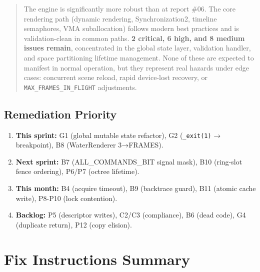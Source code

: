 \documentclass[a4paper,12pt]{article}
\newcommand{\severitybox}[2]{%
  \colorbox{#1}{\makebox[2.5cm][c]{\textcolor{white}{\textbf{#2}}}}%
}
\begin{document}
\medskip
\noindent\severitybox{highcolor}{ADEQUATE}

\begin{quote}
  The engine is significantly more robust than at report \#06. The core
  rendering path (dynamic rendering, Synchronization2, timeline semaphores,
  VMA suballocation) follows modern best practices and is validation-clean
  in common paths. \textbf{2 critical, 6 high, and 8 medium issues remain},
  concentrated in the global state layer, validation handler, and space
  partitioning lifetime management. None of these are expected to manifest
  in normal operation, but they represent real hazards under edge cases:
  concurrent scene reload, rapid device-lost recovery, or
  \texttt{MAX\_FRAMES\_IN\_FLIGHT} adjustments.
\end{quote}

\subsection*{Remediation Priority}

\begin{enumerate}[noitemsep]
  \item[\textbf{P0}] \textbf{This sprint:} G1 (global mutable state refactor),
        G2 (\texttt{\_exit(1)} → breakpoint), B8 (WaterRenderer 3→FRAMES).
  \item[\textbf{P1}] \textbf{Next sprint:} B7 (ALL\_COMMANDS\_BIT signal mask),
        B10 (ring-slot fence ordering), P6/P7 (octree lifetime).
  \item[\textbf{P2}] \textbf{This month:} B4 (acquire timeout), B9 (backtrace
        guard), B11 (atomic cache write), P8-P10 (lock contention).
  \item[\textbf{P3}] \textbf{Backlog:} P5 (descriptor writes), C2/C3 (compliance),
        B6 (dead code), G4 (duplicate return), P12 (copy elision).
\end{enumerate}

\newpage

\section{Fix Instructions Summary}
\end{document}
